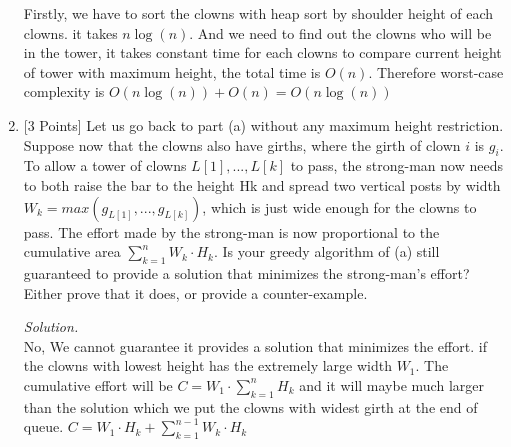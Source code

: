 \documentclass[10pt]{article}
\begin{document}
\begin{enumerate}[label=(\alph*)]
\begin{mdframed}
            Firstly, we have to sort the clowns with heap sort by shoulder height of each clowns. it takes $n\log(n)$. And we need to find out the clowns who will be in the tower, it takes constant time for each clowns to compare current height of tower with maximum height, the total time is $O(n)$. Therefore worst-case complexity is $O(n\log(n)) + O(n) = O(n\log(n))$
    \end{mdframed}
    \item {[3 Points]} Let us go back to part (a) without any maximum height restriction. Suppose now that the clowns also have girths, where the girth of clown $i$ is $g_i$. To allow a tower of clowns $L[1], . . . , L[k]$ to pass, the strong-man now needs to both raise the bar to the height Hk and spread two vertical posts by width $W_k = max(g_{L[1]}, . . . , g_{L[k]})$, which is just wide enough for the clowns to pass. The effort made by the strong-man is now proportional to the cumulative area $\sum_{k=1}^{n} W_k \cdot H_k$. Is your greedy algorithm of (a) still guaranteed to provide a solution that minimizes the strong-man’s effort? Either prove that it does, or provide a counter-example.
    \begin{mdframed}
        \textit{Solution.}\\
        No, We cannot guarantee it provides a solution that minimizes the effort. if the clowns with lowest height has the extremely large width $W_1$. The cumulative effort will be $C = W_1 \cdot \sum_{k=1}^{n} H_k$ and it will maybe much larger than the solution which we put the clowns with widest girth at the end of queue. $C = W_1 \cdot H_k + \sum_{k=1}^{n-1} W_k \cdot H_k$
    \end{mdframed}
\end{enumerate}
\end{document}
